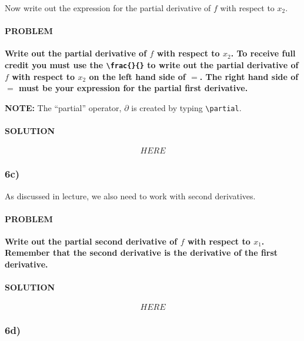 \documentclass[]{article}
\let\oldparagraph\paragraph
\renewcommand{\paragraph}[1]{\oldparagraph{#1}\mbox{}}
\begin{document}
Now write out the expression for the partial derivative of \(f\) with
respect to \(x_2\).

\hypertarget{problem-32}{%
\paragraph{PROBLEM}\label{problem-32}}

\textbf{Write out the partial derivative of \(f\) with respect to
\(x_2\). To receive full credit you must use the
\texttt{\textbackslash{}frac\{\}\{\}} to write out the partial
derivative of \(f\) with respect to \(x_2\) on the left hand side of
\(=\). The right hand side of \(=\) must be your expression for the
partial first derivative.}

\textbf{NOTE:} The ``partial'' operator, \(\partial\) is created by
typing \texttt{\textbackslash{}partial}.

\hypertarget{solution-31}{%
\paragraph{SOLUTION}\label{solution-31}}

\[ 
HERE
\]

\hypertarget{c-5}{%
\subsubsection{6c)}\label{c-5}}

As discussed in lecture, we also need to work with second derivatives.

\hypertarget{problem-33}{%
\paragraph{PROBLEM}\label{problem-33}}

\textbf{Write out the partial second derivative of \(f\) with respect to
\(x_1\). Remember that the second derivative is the derivative of the
first derivative.}

\hypertarget{solution-32}{%
\paragraph{SOLUTION}\label{solution-32}}

\[ 
HERE
\]

\hypertarget{d-5}{%
\subsubsection{6d)}\label{d-5}}
\end{document}
